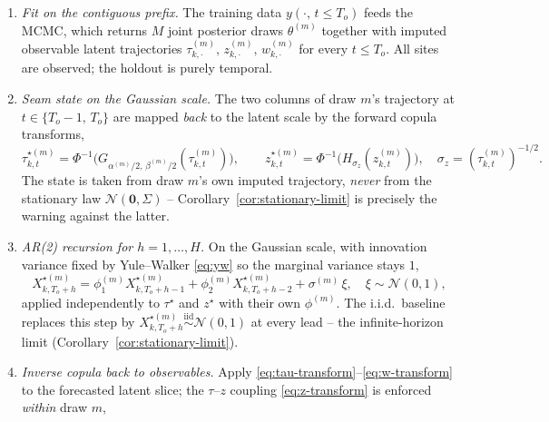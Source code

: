 \documentclass[11pt]{article}
\theoremstyle{definition}
\theoremstyle{remark}
\newcommand{\Norm}{\mathcal{N}}
\begin{document}
\begin{enumerate}[label=\textbf{(\arabic*)},leftmargin=2.4em,
                  itemsep=3pt,topsep=2pt]
  \item \emph{Fit on the contiguous prefix.} The training data
        $y(\cdot,\,t\le T_o)$ feeds the MCMC, which returns
        $M$ joint posterior draws $\theta^{(m)}$ together with imputed
        observable latent trajectories
        $\tau^{(m)}_{k,\cdot},\,z^{(m)}_{k,\cdot},\,w^{(m)}_{k,\cdot}$
        for every $t \le T_o$. All sites are observed; the holdout
        is purely temporal.
  \item \emph{Seam state on the Gaussian scale.} The two columns of
        draw $m$'s trajectory at $t \in \{T_o-1,\,T_o\}$ are mapped
        \emph{back} to the latent scale by the forward copula
        transforms,
        \begin{equation*}
          \tau^{\star(m)}_{k,t}
            = \Phi^{-1}\!\big(G_{\alpha^{(m)}/2,\,\beta^{(m)}/2}(\tau^{(m)}_{k,t})\big),
          \qquad
          z^{\star(m)}_{k,t}
            = \Phi^{-1}\!\big(H_{\sigma_z}(z^{(m)}_{k,t})\big),
          \quad \sigma_z = (\tau^{(m)}_{k,t})^{-1/2}.
        \end{equation*}
        The state is taken from draw $m$'s own imputed trajectory,
        \emph{never} from the stationary law $\Norm(\bm 0, \Sigma)$
        -- Corollary~\ref{cor:stationary-limit} is precisely the
        warning against the latter.
  \item \emph{AR(2) recursion for $h = 1,\dots,H$.} On the Gaussian
        scale, with innovation variance fixed by Yule--Walker
        \eqref{eq:yw} so the marginal variance stays $1$,
        \begin{equation*}
          X^{\star(m)}_{k,T_o+h}
          = \phi^{(m)}_1 X^{\star(m)}_{k,T_o+h-1}
          + \phi^{(m)}_2 X^{\star(m)}_{k,T_o+h-2}
          + \sigma^{(m)}\,\xi,
          \quad \xi \sim \Norm(0,1),
        \end{equation*}
        applied independently to $\tau^\star$ and $z^\star$ with
        their own $\phi^{(m)}$. The i.i.d.\ baseline replaces this
        step by $X^{\star(m)}_{k,T_o+h} \overset{\text{iid}}{\sim}
        \Norm(0,1)$ at every lead -- the infinite-horizon limit
        (Corollary~\ref{cor:stationary-limit}).
  \item \emph{Inverse copula back to observables.} Apply
        \eqref{eq:tau-transform}--\eqref{eq:w-transform} to the
        forecasted latent slice; the $\tau$--$z$ coupling
        \eqref{eq:z-transform} is enforced \emph{within} draw $m$,

\end{enumerate}
\end{document}
